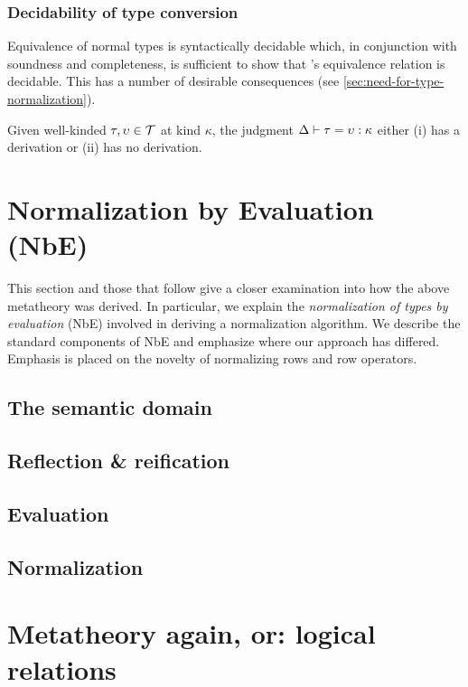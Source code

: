 \documentclass[authoryear, acmsmall, screen, review, nonacm]{acmart} %
\begin{document}
\subsubsection{Decidability of type conversion}

Equivalence of normal types is syntactically decidable which, in conjunction with soundness and completeness, is sufficient to show that \Rome's equivalence relation is decidable. This has a number of desirable consequences (see \cref{sec:need-for-type-normalization}).

\begin{theorem}[Decidability]
  Given well-kinded $\tau, \upsilon \in {\mathcal T}$ at kind $\kappa$, the judgment $\Delta \vdash \tau = \upsilon : \kappa$ either (i) has a derivation or (ii) has no derivation.
\end{theorem}

\section{Normalization by Evaluation (NbE)}
This section and those that follow give a closer examination into how the above metatheory was derived. In particular, we explain the \emph{normalization of types by evaluation} (NbE) involved in deriving a normalization algorithm. We describe the standard components of NbE and emphasize where our approach has differed. Emphasis is placed on the novelty of normalizing rows and row operators.

\subsection{The semantic domain}

\subsection{Reflection \& reification}

\subsection{Evaluation}

\subsection{Normalization}

\section{Metatheory again, or: logical relations}
\end{document}

